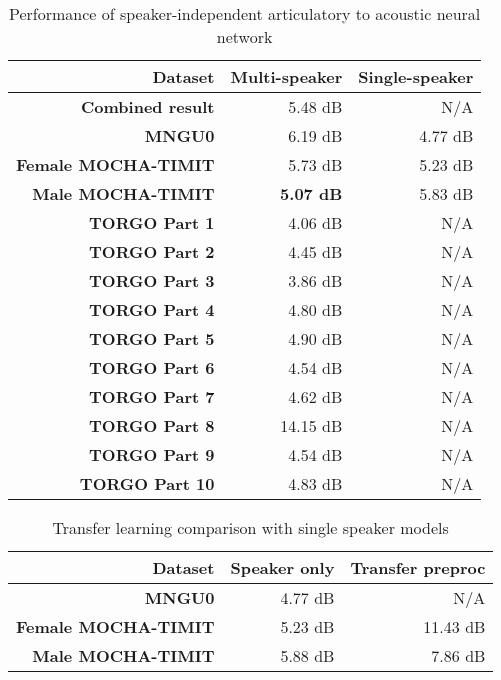 \documentclass[a4paper]{article}
\begin{document}
\begin{table}[th]
  \caption{Performance of speaker-independent articulatory to acoustic neural network}
  \label{tab:all_data}
  \centering
  \footnotesize

  \begin{tabular}{ r r r }
    \toprule
    \textbf{Dataset} & Multi-speaker & Single-speaker \\
    \midrule
    \textbf{Combined result} & 5.48 dB & N/A \\  
    \midrule
    \textbf{MNGU0} & 6.19 dB & 4.77 dB \\
    \textbf{Female MOCHA-TIMIT} & 5.73 dB & 5.23 dB \\
    \textbf{Male MOCHA-TIMIT} & \textbf{5.07 dB} & 5.83 dB \\
    \textbf{TORGO Part 1} & 4.06 dB & N/A \\
    \textbf{TORGO Part 2} & 4.45 dB & N/A \\
    \textbf{TORGO Part 3} & 3.86 dB & N/A \\
    \textbf{TORGO Part 4} & 4.80 dB & N/A \\
    \textbf{TORGO Part 5} & 4.90 dB & N/A \\
    \textbf{TORGO Part 6} & 4.54 dB & N/A \\
    \textbf{TORGO Part 7} & 4.62 dB & N/A \\
    \textbf{TORGO Part 8} & 14.15 dB & N/A\\
    \textbf{TORGO Part 9} & 4.54 dB & N/A \\
    \textbf{TORGO Part 10} & 4.83 dB & N/A \\
    \bottomrule
  \end{tabular}
\end{table}


\begin{table}[th]
  \caption{Transfer learning comparison with single speaker models}
  \label{tab:transfer}
  \centering
  \footnotesize

  \begin{tabular}{ r r r}
    \toprule
    \textbf{Dataset} & \textbf{Speaker only} & \textbf{Transfer preproc} \\
    \midrule
    \textbf{MNGU0} & 4.77 dB & N/A \\
    \textbf{Female MOCHA-TIMIT} & 5.23 dB & 11.43 dB \\
    \textbf{Male MOCHA-TIMIT} & 5.88 dB & 7.86 dB \\
    \bottomrule
  \end{tabular}
\end{table}
\end{document}

